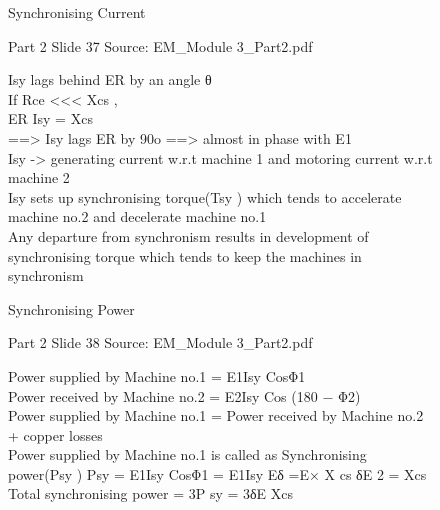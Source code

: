 \documentclass[11pt,a4paper]{article}
\begin{document}
\begin{mdframed}[roundcorner=9pt,backgroundcolor=white,linecolor=anthGreen,linewidth=1pt,innerleftmargin=12pt,innerrightmargin=12pt,innertopmargin=10pt,innerbottommargin=10pt,skipabove=8pt,skipbelow=10pt]
{\HeadingFont\fontsize{15}{18}\selectfont\color{anthDark}Synchronising Current\par}
{\color{anthMid}\small Part 2 \textbullet{} Slide 37 \textbullet{} Source: EM\_Module 3\_Part2.pdf\par}
\vspace{0.5em}
{\small
Isy lags behind ER by an angle θ\\
If Rce <<< Xcs ,\\
\smallskip
ER Isy = Xcs\\
==> Isy lags ER by 90o ==> almost in phase with E1\\
Isy -> generating current w.r.t machine 1 and motoring current w.r.t\\
machine 2\\
Isy sets up synchronising torque(Tsy ) which tends to accelerate\\
machine no.2 and decelerate machine no.1\\
Any departure from synchronism results in development of\\
synchronising torque which tends to keep the machines in\\
synchronism\\

}
\end{mdframed}

\begin{mdframed}[roundcorner=9pt,backgroundcolor=white,linecolor=anthOrange,linewidth=1pt,innerleftmargin=12pt,innerrightmargin=12pt,innertopmargin=10pt,innerbottommargin=10pt,skipabove=8pt,skipbelow=10pt]
{\HeadingFont\fontsize{15}{18}\selectfont\color{anthDark}Synchronising Power\par}
{\color{anthMid}\small Part 2 \textbullet{} Slide 38 \textbullet{} Source: EM\_Module 3\_Part2.pdf\par}
\vspace{0.5em}
{\small
Power supplied by Machine no.1 = E1Isy CosΦ1\\
Power received by Machine no.2 = E2Isy Cos (180 − Φ2)\\
Power supplied by Machine no.1 = Power received by Machine no.2\\
+ copper losses\\
Power supplied by Machine no.1 is called as Synchronising\\
power(Psy ) Psy = E1Isy CosΦ1 = E1Isy Eδ =E× X cs δE 2 = Xcs\\
\smallskip
Total synchronising power = 3P sy = 3δE Xcs\\

}
\end{mdframed}
\end{document}
